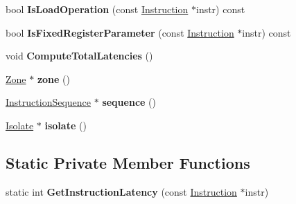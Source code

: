 \begin{DoxyCompactItemize}
\item 
bool {\bfseries Is\+Load\+Operation} (const \hyperlink{classv8_1_1internal_1_1compiler_1_1_instruction}{Instruction} $\ast$instr) const \hypertarget{classv8_1_1internal_1_1compiler_1_1_instruction_scheduler_a9b32da5cef18cdc1db68c61cebcfc9ca}{}\label{classv8_1_1internal_1_1compiler_1_1_instruction_scheduler_a9b32da5cef18cdc1db68c61cebcfc9ca}

\item 
bool {\bfseries Is\+Fixed\+Register\+Parameter} (const \hyperlink{classv8_1_1internal_1_1compiler_1_1_instruction}{Instruction} $\ast$instr) const \hypertarget{classv8_1_1internal_1_1compiler_1_1_instruction_scheduler_ab119bb6d91dc93866dc56a4eaa2dd488}{}\label{classv8_1_1internal_1_1compiler_1_1_instruction_scheduler_ab119bb6d91dc93866dc56a4eaa2dd488}

\item 
void {\bfseries Compute\+Total\+Latencies} ()\hypertarget{classv8_1_1internal_1_1compiler_1_1_instruction_scheduler_a6931f2affbec7104619c2be8c5aad6b9}{}\label{classv8_1_1internal_1_1compiler_1_1_instruction_scheduler_a6931f2affbec7104619c2be8c5aad6b9}

\item 
\hyperlink{classv8_1_1internal_1_1_zone}{Zone} $\ast$ {\bfseries zone} ()\hypertarget{classv8_1_1internal_1_1compiler_1_1_instruction_scheduler_af5fd1975aa6176b8bb8491e273e5e4fe}{}\label{classv8_1_1internal_1_1compiler_1_1_instruction_scheduler_af5fd1975aa6176b8bb8491e273e5e4fe}

\item 
\hyperlink{classv8_1_1internal_1_1compiler_1_1_instruction_sequence}{Instruction\+Sequence} $\ast$ {\bfseries sequence} ()\hypertarget{classv8_1_1internal_1_1compiler_1_1_instruction_scheduler_af8b0901d43f210dc70f72f63cebe08ac}{}\label{classv8_1_1internal_1_1compiler_1_1_instruction_scheduler_af8b0901d43f210dc70f72f63cebe08ac}

\item 
\hyperlink{classv8_1_1internal_1_1_isolate}{Isolate} $\ast$ {\bfseries isolate} ()\hypertarget{classv8_1_1internal_1_1compiler_1_1_instruction_scheduler_a7a8ae2c7fd4be930096c879156e4accf}{}\label{classv8_1_1internal_1_1compiler_1_1_instruction_scheduler_a7a8ae2c7fd4be930096c879156e4accf}

\end{DoxyCompactItemize}
\subsection*{Static Private Member Functions}
\begin{DoxyCompactItemize}
\item 
static int {\bfseries Get\+Instruction\+Latency} (const \hyperlink{classv8_1_1internal_1_1compiler_1_1_instruction}{Instruction} $\ast$instr)\hypertarget{classv8_1_1internal_1_1compiler_1_1_instruction_scheduler_ad398b1a137cceebce1c125de0c3be805}{}\label{classv8_1_1internal_1_1compiler_1_1_instruction_scheduler_ad398b1a137cceebce1c125de0c3be805}

\end{DoxyCompactItemize}

